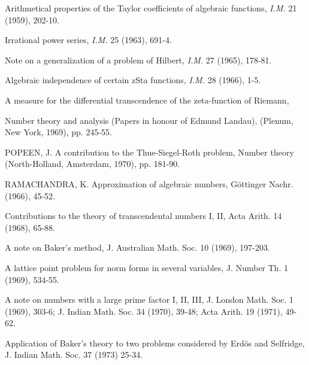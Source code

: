 \begin{hanglist}
    \item \hspace{1.5em} Arithmetical properties of the Taylor coefficients of algebraic functions, \textit{I.M.} 21 (1959), 202-10.
    \item \hspace{1.5em} Irrational power series, \textit{I.M.} 25 (1963), 691-4.
    \item \hspace{1.5em} Note on a generalization of a problem of Hilbert, \textit{I.M.} 27 (1965), 178-81.
    \item \hspace{1.5em} Algebraic independence of certain zSta functions, \textit{I.M.} 28 (1966), 1-5.
    \item \hspace{1.5em} A measure for the differential transcendence of the zeta-function of Riemann,
    \item Number theory and analysis (Papers in honour of Edmund Landau), (Plenum, New York, 1969), pp. 245-55.
    \item POPEEN, J. A contribution to the Thue-Siegel-Roth problem, Number theory (North-Holland, Amsterdam, 1970), pp. 181-90.
    \item RAMACHANDRA, K. Approximation of algebraic numbers, Göttinger Nachr. (1966), 45-52.
    \item \hspace{1.5em} Contributions to the theory of transcendental numbers I, II, Acta Arith. 14 (1968), 65-88.
    \item \hspace{1.5em} A note on Baker's method, J. Australian Math. Soc. 10 (1969), 197-203.
    \item \hspace{1.5em} A lattice point problem for norm forms in several variables, J. Number Th. 1 (1969), 534-55.
    \item \hspace{1.5em} A note on numbers with a large prime factor I, II, III, J. London Math. Soc. 1 (1969), 303-6; J. Indian Math. Soc. 34 (1970), 39-48; Acta Arith. 19 (1971), 49-62.
    \item \hspace{1.5em} Application of Baker's theory to two problems considered by Erdös and Selfridge, J. Indian Math. Soc. 37 (1973) 25-34.

\end{hanglist}
